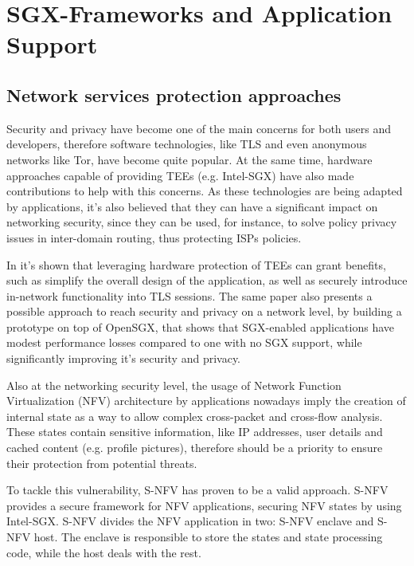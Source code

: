 \section{SGX-Frameworks and Application Support} %
\label{sec:sgx_frameworks}





\subsection{Network services protection approaches}
\label{ssec:sgx_network_frameworks}

Security and privacy have become one of the main concerns for both users and developers, therefore software technologies, like TLS and even anonymous networks like Tor, have become quite popular. At the same time, hardware approaches capable of providing TEEs (e.g. Intel-SGX) have also made contributions to help with this concerns. 
As these technologies are being adapted by applications, it's also believed that they can have a significant impact on networking security, since they can be used, for instance, to solve policy privacy issues in inter-domain routing, thus protecting ISPs policies. 

In \cite{torSGXPaper} it's shown that leveraging hardware protection of TEEs can grant benefits, such as simplify the overall design of the application, as well as securely introduce in-network functionality into TLS sessions. 
The same paper also presents a possible approach to reach security and privacy on a network level, by building a prototype on top of OpenSGX, that shows that SGX-enabled applications have modest performance losses compared to one with no SGX support, while significantly improving it's security and privacy.

Also at the networking security level, the usage of Network Function Virtualization (NFV) architecture by applications nowadays imply the creation of internal state as a way to allow complex cross-packet and cross-flow analysis. These states contain sensitive information, like IP addresses, user details and cached content (e.g. profile pictures), therefore should be a priority to ensure their protection from potential threats. 

To tackle this vulnerability, S-NFV has proven to be a valid approach. 
S-NFV provides a secure framework for NFV applications, securing NFV states by using Intel-SGX. S-NFV divides the NFV application in two: S-NFV enclave and S-NFV host. The enclave is responsible to store the states and state processing code, while the host deals with the rest.

